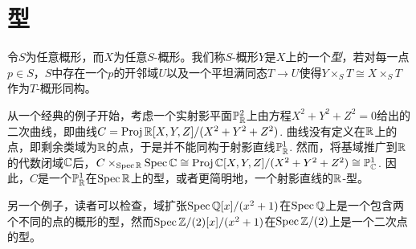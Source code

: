 \section{型}\label{s:4.4}

\nottran

令$S$为任意概形，而$X$为任意$S$-概形。我们称$S$-概形$Y$是$X$上的一个\textit{型}，若对每一点$p\in S$，$S$中存在一个$p$的开邻域$U$以及一个平坦满同态$T\to U$使得$Y\times_S T\cong X\times_S T$作为$T$-概形同构。

从一个经典的例子开始，考虑一个实射影平面$\mathbb{P}_{\mathbb{R}}^2$上由方程$X^2+Y^2+Z^2=0$给出的二次曲线，即曲线$C=\operatorname{Proj} \mathbb{R}[X,Y,Z]/(X^2+Y^2+Z^2)$. 曲线没有定义在$\mathbb{R}$上的点，即剩余类域为$\mathbb{R}$的点，于是并不能同构于射影直线$\mathbb{P}_{\mathbb{R}}^1$. 然而，将基域推广到$\mathbb{R}$的代数闭域$\mathbb{C}$后，$C\times_{\operatorname{Spec} \mathbb{R}}\operatorname{Spec} \mathbb{C}\cong \operatorname{Proj} \mathbb{C}[X,Y,Z]/(X^2+Y^2+Z^2)\cong \mathbb{P}_{\mathbb{C}}^1$. 因此，$C$是一个$\mathbb{P}_{\mathbb{R}}^1$在$\operatorname{Spec} \mathbb{R}$上的型，或者更简明地，一个射影直线的$\mathbb{R}$-型。

另一个例子，读者可以检查，域扩张$\operatorname{Spec} \mathbb Q[x]/(x^2+1)$在$\operatorname{Spec} \mathbb Q$上是一个包含两个不同的点的概形的型，然而$\operatorname{Spec} \mathbb{Z}/(2)[x]/(x^2+1)$在$\operatorname{Spec} \mathbb{Z}/(2)$上是一个二次点的型。